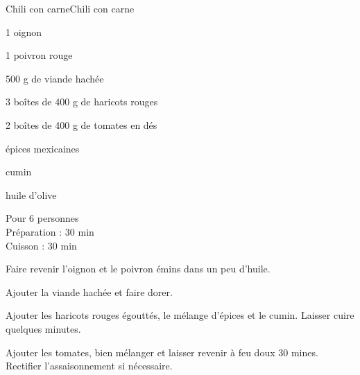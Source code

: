 \begin{recette}{Chili con carne}{Chili con carne}

\begin{ingredients}
1 oignon\par
1 poivron rouge\par
500 g de viande hachée\par
3 boîtes de 400 g de haricots rouges\par
2 boîtes de 400 g de tomates en dés\par
épices mexicaines\par
cumin\par
huile d'olive\par
\end{ingredients}

\begin{infos}
Pour 6 personnes\\
Préparation : 30 min\\
Cuisson : 30 min\\
\end{infos}

\begin{etapes}
\item Faire revenir l'oignon et le poivron émins dans un peu d'huile.
\item Ajouter la viande hachée et faire dorer.
\item Ajouter les haricots rouges égouttés, le mélange d'épices et le cumin. Laisser cuire quelques minutes.
\item Ajouter les tomates, bien mélanger et laisser revenir à feu doux 30 mines. Rectifier l'assaisonnement si nécessaire.
\end{etapes}

\end{recette}